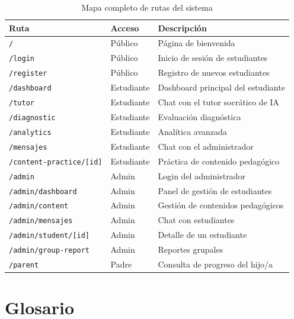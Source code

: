 \documentclass[12pt, a4paper, oneside]{book}
\begin{document}
\begin{table}[H]
\centering
\renewcommand{\arraystretch}{1.3}
\begin{tabularx}{\textwidth}{l l X}
    \toprule
    \textbf{Ruta} & \textbf{Acceso} & \textbf{Descripción} \\
    \midrule
    \texttt{/} & Público & Página de bienvenida \\
    \texttt{/login} & Público & Inicio de sesión de estudiantes \\
    \texttt{/register} & Público & Registro de nuevos estudiantes \\
    \midrule
    \texttt{/dashboard} & Estudiante & Dashboard principal del estudiante \\
    \texttt{/tutor} & Estudiante & Chat con el tutor socrático de IA \\
    \texttt{/diagnostic} & Estudiante & Evaluación diagnóstica \\
    \texttt{/analytics} & Estudiante & Analítica avanzada \\
    \texttt{/mensajes} & Estudiante & Chat con el administrador \\
    \texttt{/content-practice/[id]} & Estudiante & Práctica de contenido pedagógico \\
    \midrule
    \texttt{/admin} & Admin & Login del administrador \\
    \texttt{/admin/dashboard} & Admin & Panel de gestión de estudiantes \\
    \texttt{/admin/content} & Admin & Gestión de contenidos pedagógicos \\
    \texttt{/admin/mensajes} & Admin & Chat con estudiantes \\
    \texttt{/admin/student/[id]} & Admin & Detalle de un estudiante \\
    \texttt{/admin/group-report} & Admin & Reportes grupales \\
    \midrule
    \texttt{/parent} & Padre & Consulta de progreso del hijo/a \\
    \bottomrule
\end{tabularx}
\caption{Mapa completo de rutas del sistema}
\end{table}


\chapter{Glosario}
\end{document}
